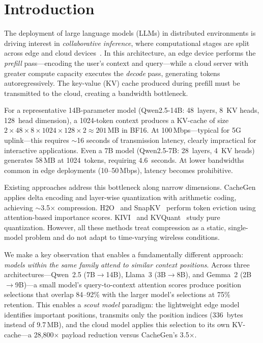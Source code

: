 \documentclass[journal]{IEEEtran}
\begin{document}
\section{Introduction}
\label{sec:intro}

The deployment of large language models (LLMs) in distributed environments is driving interest in \emph{collaborative inference}, where computational stages are split across edge and cloud devices~\cite{splitwise,distserve}.
In this architecture, an edge device performs the \emph{prefill} pass---encoding the user's context and query---while a cloud server with greater compute capacity executes the \emph{decode} pass, generating tokens autoregressively.
The key-value (KV) cache produced during prefill must be transmitted to the cloud, creating a bandwidth bottleneck.

For a representative 14B-parameter model (Qwen2.5-14B: 48~layers, 8~KV heads, 128~head dimension), a 1024-token context produces a KV-cache of size $2 \times 48 \times 8 \times 1024 \times 128 \times 2 \approx 201$\,MB in BF16.
At 100\,Mbps---typical for 5G uplink---this requires $\sim$16 seconds of transmission latency, clearly impractical for interactive applications.
Even a 7B model (Qwen2.5-7B: 28~layers, 4~KV heads) generates 58\,MB at 1024~tokens, requiring 4.6~seconds.
At lower bandwidths common in edge deployments (10--50\,Mbps), latency becomes prohibitive.

Existing approaches address this bottleneck along narrow dimensions.
CacheGen~\cite{cachegen} applies delta encoding and layer-wise quantization with arithmetic coding, achieving $\sim$3.5$\times$ compression.
H2O~\cite{h2o} and SnapKV~\cite{snapkv} perform token eviction using attention-based importance scores.
KIVI~\cite{kivi} and KVQuant~\cite{kvquant} study pure quantization.
However, all these methods treat compression as a static, single-model problem and do not adapt to time-varying wireless conditions.

We make a key observation that enables a fundamentally different approach: \emph{models within the same family attend to similar context positions}.
Across three architectures---Qwen~2.5 (7B$\to$14B), Llama~3 (3B$\to$8B), and Gemma~2 (2B$\to$9B)---a small model's query-to-context attention scores produce position selections that overlap 84--92\% with the larger model's selections at 75\% retention.
This enables a \emph{scout model} paradigm: the lightweight edge model identifies important positions, transmits only the position indices (336~bytes instead of 9.7\,MB), and the cloud model applies this selection to its own KV-cache---a 28{,}800$\times$ payload reduction versus CacheGen's 3.5$\times$.
\end{document}
